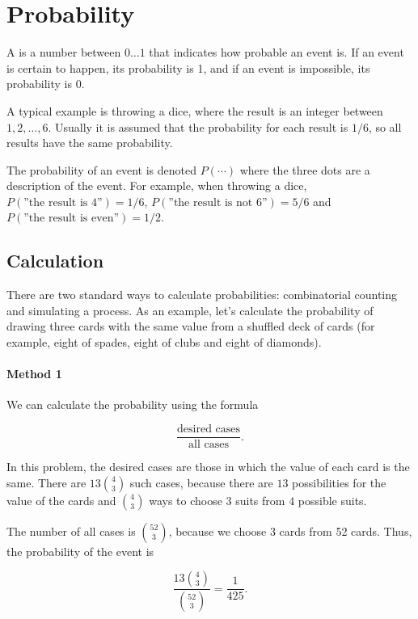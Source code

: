 \chapter{Probability}


A  is a number between $0 \ldots 1$
that indicates how probable an event is.
If an event is certain to happen,
its probability is 1,
and if an event is impossible,
its probability is 0.

A typical example is throwing a dice,
where the result is an integer between
$1,2,\ldots,6$.
Usually it is assumed that the probability
for each result is $1/6$,
so all results have the same probability.

The probability of an event is denoted $P(\cdots)$
where the three dots are
a description of the event.
For example, when throwing a dice,
$P(\textrm{''the result is 4''})=1/6$,
$P(\textrm{''the result is not 6''})=5/6$
and $P(\textrm{''the result is even''})=1/2$.

\section{Calculation}

There are two standard ways to calculate
probabilities: combinatorial counting
and simulating a process.
As an example, let's calculate the probability
of drawing three cards with the same value
from a shuffled deck of cards
(for example, eight of spades,
eight of clubs and eight of diamonds).

\subsubsection*{Method 1}

We can calculate the probability using
the formula

\[\frac{\textrm{desired cases}}{\textrm{all cases}}.\]

In this problem, the desired cases are those
in which the value of each card is the same.
There are $13 {4 \choose 3}$ such cases,
because there are $13$ possibilities for the
value of the cards and ${4 \choose 3}$ ways to
choose $3$ suits from $4$ possible suits.

The number of all cases is ${52 \choose 3}$,
because we choose 3 cards from 52 cards.
Thus, the probability of the event is

\[\frac{13 {4 \choose 3}}{{52 \choose 3}} = \frac{1}{425}.\]

